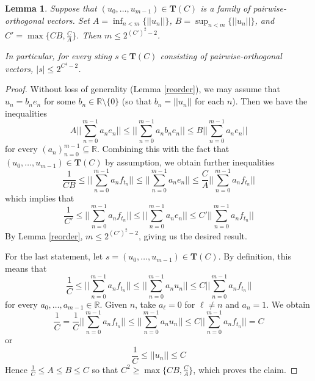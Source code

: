 \documentclass[10pt,a4paper]{amsart}
\newtheorem{lemma}{Lemma}
\newcommand{\R}{\mathbb R}
\begin{document}
\begin{lemma}\label{boundedorthogonal}
Suppose that $(u_0,\ldots, u_{m-1})\in \textbf{T}(C)$ is a family of pairwise-orthogonal vectors. Set $A = \inf_{n<m}\{||u_n||\}$, $B = \sup_{n < m} \{||u_n||\}$, and $C' = \max\{C B, \frac{C}{A}\}$. Then $m \leq 2^{(C')^2-2}$. 

In particular, for every sting $s\in \textbf{T}(C)$ consisting of pairwise-orthogonal vectors, $|s|\leq 2^{C^4-2}$.
\end{lemma}

\begin{proof}
Without loss of generality (Lemma \ref{reorder}), we may assume that $u_n = b_n e_n$ for some $b_n\in\mathbb R\setminus\{0\}$ (so that $b_n = ||u_n||$ for each $n$). Then we have the inequalities
\begin{equation*}
A\bigg|\bigg|\sum_{n=0}^{m-1} a_n e_n\bigg|\bigg| \leq \bigg|\bigg|\sum_{n=0}^{m-1} a_n b_n e_n\bigg|\bigg| \leq B\bigg|\bigg|\sum_{n=0}^{m-1} a_n e_n\bigg|\bigg|
\end{equation*}
for every $(a_n)_{n=0}^{m-1}\subseteq \R$. Combining this with the fact that $(u_0,\ldots, u_{m-1})\in \textbf{T}(C)$ by assumption, we obtain further inequalities
\begin{equation*}
\frac{1}{C B} \leq \bigg|\bigg|\sum_{n=0}^{m-1} a_n f_{t_n}\bigg|\bigg| \leq \bigg|\bigg|\sum_{n=0}^{m-1} a_n e_n\bigg|\bigg| \leq \frac{C}{A} \bigg|\bigg| \sum_{n=0}^{m-1} a_n f_{t_n}\bigg|\bigg|
\end{equation*}
which implies that
\begin{equation*}
\frac{1}{C'} \leq \bigg|\bigg|\sum_{n=0}^{m-1} a_n f_{t_n}\bigg|\bigg| \leq \bigg|\bigg|\sum_{n=0}^{m-1} a_n e_n\bigg|\bigg| \leq C' \bigg|\bigg| \sum_{n=0}^{m-1} a_n f_{t_n}\bigg|\bigg|
\end{equation*}
By Lemma \ref{reorder}, $m\leq 2^{(C')^2-2}$, giving us the desired result.

For the last statement, let $s = (u_0,\ldots, u_{m-1})\in\textbf{T}(C)$. By definition, this means that 
\begin{equation*}
\frac{1}{C} \leq \bigg|\bigg|\sum_{n=0}^{m-1} a_n f_{t_n}\bigg|\bigg| \leq \bigg|\bigg|\sum_{n=0}^{m-1} a_n u_n\bigg|\bigg| \leq C \bigg|\bigg| \sum_{n=0}^{m-1} a_n f_{t_n}\bigg|\bigg|
\end{equation*}
for every $a_0,\ldots, a_{m-1}\in \mathbb R$. Given $n$, take $a_\ell = 0$ for $\ell\neq n$ and $a_n = 1$. We obtain
\begin{equation*}
\frac{1}{C} = \frac{1}{C} \bigg|\bigg|\sum_{n=0}^{m-1} a_n f_{t_n}\bigg|\bigg| \leq \bigg|\bigg|\sum_{n=0}^{m-1} a_n u_n\bigg|\bigg| \leq C \bigg|\bigg| \sum_{n=0}^{m-1} a_n f_{t_n}\bigg|\bigg| = C
\end{equation*}
or
\begin{equation*}
\frac{1}{C}\leq ||u_n|| \leq C
\end{equation*}
Hence $\frac{1}{C}\leq A \leq B\leq C$ so that $C^2\geq \max\{C B,\frac{C}{A}\}$, which proves the claim.
\end{proof}
\end{document}
